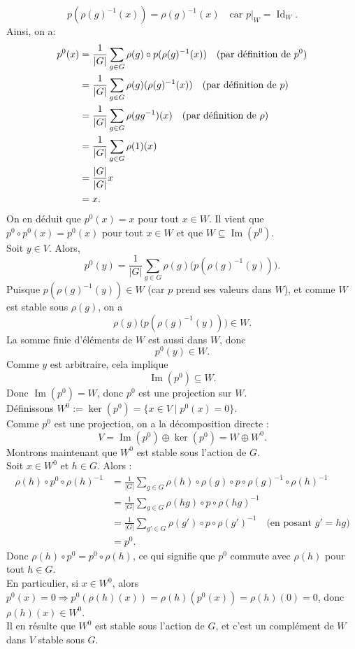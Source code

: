 \documentclass[a4paper, 14pt]{report}
\begin{document}
\begin{onehalfspace}
{			\[
			p(\rho(g)^{-1}(x)) = \rho(g)^{-1}(x) \quad \text{car } p|_W = \operatorname{Id}_W.
			\]
			Ainsi, on a:
			\[
			\begin{aligned}
				p^0(x) &= \frac{1}{|G|} \sum_{g \in G} \rho(g) \circ p(\rho(g)^{-1}(x)) \quad \text{(par définition de \( p^0 \))} \\
				&= \frac{1}{|G|} \sum_{g \in G} \rho(g)(\rho(g)^{-1}(x)) \quad \text{(par définition de \( p \))} \\
				&= \frac{1}{|G|} \sum_{g \in G} \rho(gg^{-1})(x) \quad \text{(par définition de \( \rho \))} \\
				&= \frac{1}{|G|} \sum_{g \in G} \rho(1)(x) \\
				&= \frac{|G|}{|G|} x \\
				&= x.
			\end{aligned}
			\]
			On en déduit que \( p^0(x) = x \) pour tout \( x \in W \). Il vient que \( p^0 \circ p^0(x) = p^0(x) \) pour tout \( x \in W \) et que \(W \subseteq \operatorname{Im}(p^0) \).\\
			Soit \( y \in V \). Alors,
			\[
			p^0(y) = \frac{1}{|G|} \sum_{g \in G} \rho(g) \big( p(\rho(g)^{-1}(y)) \big).
			\]
			Puisque \( p(\rho(g)^{-1}(y)) \in W \) (car \( p \) prend ses valeurs dans \( W \)),
			et comme \( W \) est stable sous \( \rho(g) \), on a
			\[
			\rho(g) \big( p(\rho(g)^{-1}(y)) \big) \in W.
			\]
			La somme finie d’éléments de \( W \) est aussi dans \( W \), donc
			\[
			p^0(y) \in W.
			\]
			Comme \( y \) est arbitraire, cela implique
			\[
			\operatorname{Im}(p^0) \subseteq W.
			\]
			Donc \( \operatorname{Im}(p^0) = W \), donc \( p^0 \) est une projection sur \( W \).\\
			Définissons \( W^0 := \ker(p^0) = \{ x \in V \mid p^0(x) = 0 \} \).\\
			Comme \( p^0 \) est une projection, on a la décomposition directe :
			\[
			V = \operatorname{Im}(p^0) \oplus \ker(p^0) = W \oplus W^0.
			\]
			Montrons maintenant que \( W^0 \) est stable sous l’action de \( G \).\\
			Soit \( x \in W^0 \) et \( h \in G \). Alors :
			\[
			\begin{aligned}
				\rho(h) \circ p^0 \circ \rho(h)^{-1}
				&= \frac{1}{|G|} \sum_{g \in G} \rho(h) \circ \rho(g) \circ p \circ \rho(g)^{-1} \circ \rho(h)^{-1} \\
				&= \frac{1}{|G|} \sum_{g \in G} \rho(hg) \circ p \circ \rho(hg)^{-1} \\
				&= \frac{1}{|G|} \sum_{g' \in G} \rho(g') \circ p \circ \rho(g')^{-1} \quad \text{(en posant } g' = hg) \\
				&= p^0.
			\end{aligned}
			\]
			Donc \( \rho(h) \circ p^0 = p^0 \circ \rho(h) \), ce qui signifie que \( p^0 \) commute avec \( \rho(h) \) pour tout \( h \in G \).\\
			En particulier, si \( x \in W^0 \), alors \( p^0(x) = 0 \Rightarrow p^0(\rho(h)(x)) = \rho(h)(p^0(x)) = \rho(h)(0) = 0 \), donc \( \rho(h)(x) \in W^0 \).\\
			Il en résulte que \( W^0 \) est stable sous l’action de \( G \), et c’est un complément de \( W \) dans \( V \) stable sous \( G \).
			
}
\end{onehalfspace}
\end{document}
